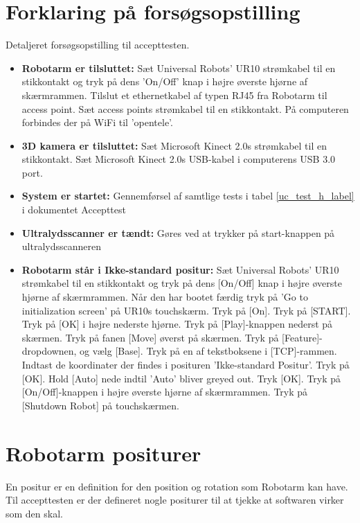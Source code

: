 \section{Forklaring på forsøgsopstilling}
Detaljeret forsøgsopstilling til accepttesten. 

\begin{itemize}
\item \textbf{Robotarm er tilsluttet:} Sæt Universal Robots' UR10 strømkabel til en stikkontakt og tryk på dens 'On/Off' knap i højre øverste hjørne af skærmrammen. Tilslut et ethernetkabel af typen RJ45 fra Robotarm til access point. Sæt access points strømkabel til en stikkontakt. På computeren forbindes der på WiFi til 'opentele'.
\item \textbf{3D kamera er tilsluttet:} Sæt Microsoft Kinect 2.0s strømkabel til en stikkontakt. Sæt Microsoft Kinect 2.0s USB-kabel i computerens USB 3.0 port.
\item \textbf{System er startet:} Gennemførsel af samtlige tests i tabel \ref{uc_test_h_label} i dokumentet Accepttest
\item \textbf{Ultralydsscanner er tændt:} Gøres ved at trykker på start-knappen på ultralydsscanneren
\item \textbf{Robotarm står i Ikke-standard positur:} Sæt Universal Robots' UR10 strømkabel til en stikkontakt og tryk på dens [On/Off] knap i højre øverste hjørne af skærmrammen. Når den har bootet færdig tryk på 'Go to initialization screen' på UR10s touchskærm. Tryk på [On]. Tryk på [START]. Tryk på [OK] i højre nederste hjørne. Tryk på [Play]-knappen nederst på skærmen. Tryk på fanen [Move] øverst på skærmen. Tryk på [Feature]-dropdownen, og vælg [Base]. Tryk på en af tekstboksene i [TCP]-rammen. Indtast de koordinater der findes i posituren 'Ikke-standard Positur'. Tryk på [OK]. Hold [Auto] nede indtil 'Auto' bliver greyed out. Tryk [OK]. Tryk på [On/Off]-knappen i højre øverste hjørne af skærmrammen. Tryk på [Shutdown Robot] på touchskærmen.
\end{itemize}


\section{Robotarm positurer}
En positur er en definition for den position og rotation som Robotarm kan have. Til accepttesten er der defineret nogle positurer til at tjekke at softwaren virker som den skal. 

